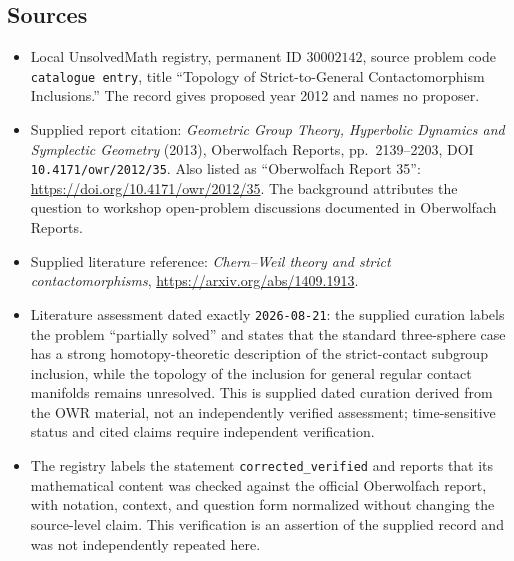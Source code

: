 \documentclass[11pt]{article}
\begin{document}
\subsection{Sources}
\begin{itemize}
\item Local UnsolvedMath registry, permanent ID \(30002142\), source problem code \texttt{catalogue entry}, title ``Topology of Strict-to-General Contactomorphism Inclusions.'' The record gives proposed year 2012 and names no proposer.
\item Supplied report citation: \emph{Geometric Group Theory, Hyperbolic Dynamics and Symplectic Geometry} (2013), Oberwolfach Reports, pp.\ 2139--2203, DOI \texttt{10.4171/owr/2012/35}. Also listed as ``Oberwolfach Report 35'': \url{https://doi.org/10.4171/owr/2012/35}. The background attributes the question to workshop open-problem discussions documented in Oberwolfach Reports.
\item Supplied literature reference: \emph{Chern--Weil theory and strict contactomorphisms}, \url{https://arxiv.org/abs/1409.1913}.
\item Literature assessment dated exactly \texttt{2026-08-21}: the supplied curation labels the problem ``partially solved'' and states that the standard three-sphere case has a strong homotopy-theoretic description of the strict-contact subgroup inclusion, while the topology of the inclusion for general regular contact manifolds remains unresolved. This is supplied dated curation derived from the OWR material, not an independently verified assessment; time-sensitive status and cited claims require independent verification.
\item The registry labels the statement \texttt{corrected\_verified} and reports that its mathematical content was checked against the official Oberwolfach report, with notation, context, and question form normalized without changing the source-level claim. This verification is an assertion of the supplied record and was not independently repeated here.
\end{itemize}
\end{document}
